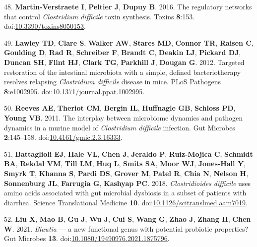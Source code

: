 \documentclass[
  12pt,
]{article}
\newenvironment{cslreferences}%
  {}%
  {\par}
\begin{document}
\begin{cslreferences}
\leavevmode\hypertarget{ref-MartinVerstraete2016}{}%
48. \textbf{Martin-Verstraete I}, \textbf{Peltier J}, \textbf{Dupuy B}.
2016. The regulatory networks that control \emph{Clostridium difficile}
toxin synthesis. Toxins \textbf{8}:153.
doi:\href{https://doi.org/10.3390/toxins8050153}{10.3390/toxins8050153}.

\leavevmode\hypertarget{ref-Lawley2012}{}%
49. \textbf{Lawley TD}, \textbf{Clare S}, \textbf{Walker AW},
\textbf{Stares MD}, \textbf{Connor TR}, \textbf{Raisen C},
\textbf{Goulding D}, \textbf{Rad R}, \textbf{Schreiber F},
\textbf{Brandt C}, \textbf{Deakin LJ}, \textbf{Pickard DJ},
\textbf{Duncan SH}, \textbf{Flint HJ}, \textbf{Clark TG},
\textbf{Parkhill J}, \textbf{Dougan G}. 2012. Targeted restoration of
the intestinal microbiota with a simple, defined bacteriotherapy
resolves relapsing \emph{Clostridium difficile} disease in mice. PLoS
Pathogens \textbf{8}:e1002995.
doi:\href{https://doi.org/10.1371/journal.ppat.1002995}{10.1371/journal.ppat.1002995}.

\leavevmode\hypertarget{ref-Reeves2011}{}%
50. \textbf{Reeves AE}, \textbf{Theriot CM}, \textbf{Bergin IL},
\textbf{Huffnagle GB}, \textbf{Schloss PD}, \textbf{Young VB}. 2011. The
interplay between microbiome dynamics and pathogen dynamics in a murine
model of \emph{Clostridium difficile} infection. Gut Microbes
\textbf{2}:145--158.
doi:\href{https://doi.org/10.4161/gmic.2.3.16333}{10.4161/gmic.2.3.16333}.

\leavevmode\hypertarget{ref-Battaglioli2018}{}%
51. \textbf{Battaglioli EJ}, \textbf{Hale VL}, \textbf{Chen J},
\textbf{Jeraldo P}, \textbf{Ruiz-Mojica C}, \textbf{Schmidt BA},
\textbf{Rekdal VM}, \textbf{Till LM}, \textbf{Huq L}, \textbf{Smits SA},
\textbf{Moor WJ}, \textbf{Jones-Hall Y}, \textbf{Smyrk T},
\textbf{Khanna S}, \textbf{Pardi DS}, \textbf{Grover M}, \textbf{Patel
R}, \textbf{Chia N}, \textbf{Nelson H}, \textbf{Sonnenburg JL},
\textbf{Farrugia G}, \textbf{Kashyap PC}. 2018. \emph{Clostridioides
difficile} uses amino acids associated with gut microbial dysbiosis in a
subset of patients with diarrhea. Science Translational Medicine
\textbf{10}.
doi:\href{https://doi.org/10.1126/scitranslmed.aam7019}{10.1126/scitranslmed.aam7019}.

\leavevmode\hypertarget{ref-Liu2021}{}%
52. \textbf{Liu X}, \textbf{Mao B}, \textbf{Gu J}, \textbf{Wu J},
\textbf{Cui S}, \textbf{Wang G}, \textbf{Zhao J}, \textbf{Zhang H},
\textbf{Chen W}. 2021. \emph{Blautia} --- a new functional genus with
potential probiotic properties? Gut Microbes \textbf{13}.
doi:\href{https://doi.org/10.1080/19490976.2021.1875796}{10.1080/19490976.2021.1875796}.


\end{cslreferences}
\end{document}
